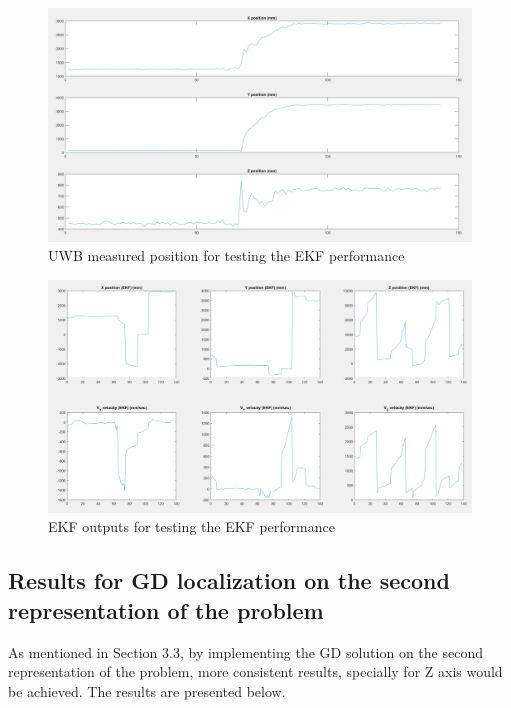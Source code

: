 \documentclass{article}
\begin{document}
\begin{figure}[thpb]
\centering
\includegraphics[scale=0.4]{Pics/EKF_Test_UWB.PNG}
\caption{UWB measured position for testing the EKF performance}
\label{Fig_09}
\end{figure}

\begin{figure}[thpb]
\centering
\includegraphics[scale=0.4]{Pics/EKF_Test_EKF.PNG}
\caption{EKF outputs for testing the EKF performance}
\label{Fig_10}
\end{figure}

\newpage
\subsection{Results for GD localization on the second representation of the problem}
As mentioned in Section 3.3, by implementing the GD solution on the second representation of the problem, more consistent results, specially for Z axis would be achieved. The results are presented below.
\end{document}
